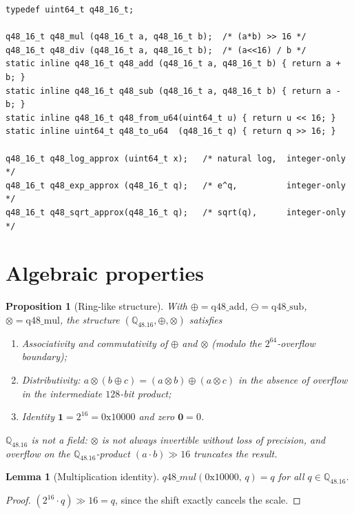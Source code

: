 \documentclass[11pt,letterpaper,openany]{book}
\theoremstyle{definition}
\theoremstyle{plain}
\newtheorem{proposition}[definition]{Proposition}
\newtheorem{lemma}[definition]{Lemma}
\newcommand{\Qfp}{\mathbb{Q}_{48.16}}                %
\begin{document}
\begin{lstlisting}[caption={$\Qfp$ type and operations
  (\texttt{include/q48\_16.h}).},label={lst:q4816}]
typedef uint64_t q48_16_t;

q48_16_t q48_mul (q48_16_t a, q48_16_t b);  /* (a*b) >> 16 */
q48_16_t q48_div (q48_16_t a, q48_16_t b);  /* (a<<16) / b */
static inline q48_16_t q48_add (q48_16_t a, q48_16_t b) { return a + b; }
static inline q48_16_t q48_sub (q48_16_t a, q48_16_t b) { return a - b; }
static inline q48_16_t q48_from_u64(uint64_t u) { return u << 16; }
static inline uint64_t q48_to_u64  (q48_16_t q) { return q >> 16; }

q48_16_t q48_log_approx (uint64_t x);   /* natural log,  integer-only */
q48_16_t q48_exp_approx (q48_16_t q);   /* e^q,          integer-only */
q48_16_t q48_sqrt_approx(q48_16_t q);   /* sqrt(q),      integer-only */
\end{lstlisting}

\section{Algebraic properties}

\begin{proposition}[Ring-like structure]\label{prop:q4816-ring}
With $\oplus = \mathrm{q48\_add}$, $\ominus = \mathrm{q48\_sub}$,
$\otimes = \mathrm{q48\_mul}$, the structure $(\Qfp,\oplus,\otimes)$
satisfies
\begin{enumerate}\setlength\itemsep{0pt}
  \item Associativity and commutativity of $\oplus$ and $\otimes$
    (modulo the $2^{64}$-overflow boundary);
  \item Distributivity: $a\otimes(b\oplus c) = (a\otimes b)\oplus(a\otimes c)$
    in the absence of overflow in the intermediate $128$-bit product;
  \item Identity $\mathbf{1} = 2^{16} = \mathrm{0x10000}$ and zero $\mathbf{0} = 0$.
\end{enumerate}
$\Qfp$ is \emph{not} a field: $\otimes$ is not always invertible without
loss of precision, and overflow on the $\Qfp$-product
$(a\cdot b)\gg 16$ truncates the result.
\end{proposition}

\begin{lemma}[Multiplication identity]
$q48\_mul(\mathrm{0x10000},\,q) = q$ for all $q\in\Qfp$.
\end{lemma}

\begin{proof}
$(2^{16}\cdot q) \gg 16 = q$, since the shift exactly cancels the scale.
\end{proof}
\end{document}
